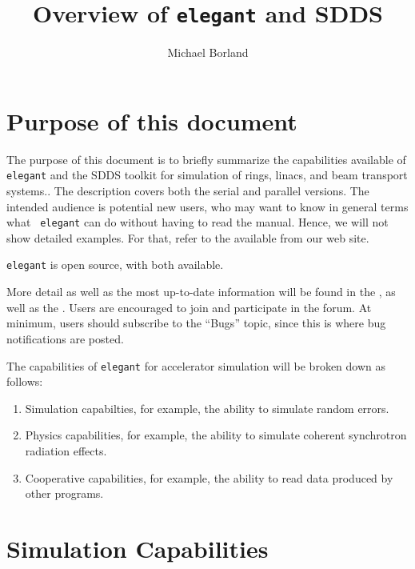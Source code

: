 \documentclass[11pt]{article}
\begin{document}
\author{Michael Borland}
\title{Overview of {\tt elegant} and SDDS}
\maketitle

\section{Purpose of this document}

The purpose of this document is to briefly summarize the capabilities
available of {\tt elegant} and the SDDS toolkit for simulation of
rings, linacs, and beam transport systems..  The description covers
both the serial and parallel versions.  The intended audience is
potential new users, who may want to know in general terms what {\tt
elegant} can do without having to read the manual.  Hence, we will not
show detailed examples.  For that, refer to the
available from our web site.

{\tt elegant} is open source, with both  available.

More detail as well as the most up-to-date information will be found in the 
,
as well as the 
.  Users are encouraged
to join and participate in the forum.  At minimum, users should subscribe to the ``Bugs'' topic,
since this is where bug notifications are posted.

The capabilities of {\tt elegant} for accelerator simulation will be broken down as follows:
\begin{enumerate}
\item Simulation capabilties, for example, the ability to simulate random errors.
\item Physics capabilities, for example, the ability to simulate coherent synchrotron radiation effects.
\item Cooperative capabilities, for example, the ability to read data produced by other programs.
\end{enumerate}

\section{Simulation Capabilities}
\end{document}
